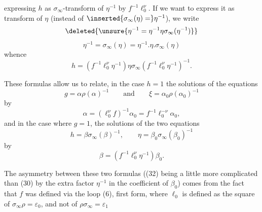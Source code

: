 
expressing $h$ as $\sigma_\infty$-transform of $\eta^{-1}$ by $f^{-1}\ell_0^\nu$. If we want to express it as \inserted{$\sigma_\infty$-}transform of $\eta$ (instead of $\inserted{\sigma_\infty(\eta)=}\eta^{-1}$), we write
\[
 \deleted{\unsure{\eta^{-1}=\eta^{-1}\eta\sigma_\infty(\eta^{-1})}}
\]
\[
 \eta^{-1}=\sigma_\infty(\eta)=\eta^{-1}.\eta.\sigma_\infty(\eta)
\]
whence
\[
 h=(f^{-1}\ell_0^\nu\eta^{-1})\eta\sigma_\infty(f^{-1}\ell_0^\nu\eta^{-1})^{-1}.
 \tag{28bis}
\]

These formulas allow us to relate, in the case $h=1$ the solutions of the  equations
\[
 g=\alpha\rho(\alpha)^{-1}
 \qquad\text{and}\qquad
 \xi=\alpha_0\rho(\alpha_0)^{-1}
 \tag{29}
\]
by
\[
 \alpha=(\ell_0^\nu f)^{-1}\alpha_0=f^{-1}\ell_0^{-\nu}\alpha_0,
 \tag{30}
\]
and in the case where $g=1$, the solutions of the two equations
\[
 h=\beta\sigma_\infty(\beta)^{-1},\qquad
 \eta=\beta_0\sigma_\infty(\beta_0)^{-1}
 \tag{31}
\]
by
\[
 \beta=(f^{-1}\ell_0^\nu\eta^{-1})\beta_0.
 \tag{32}
\]

The asymmetry between these two formulas ((32) being a little more complicated than (30) by the extra factor $\eta^{-1}$ in the coefficient of $\beta_0$) comes from the fact that $f$ was defined via the loop  (6), first form, where $\ell_0$ is defined as the square of $\sigma_\infty\rho=\varepsilon_0$, and not of $\rho\sigma_\infty=\varepsilon_1$


